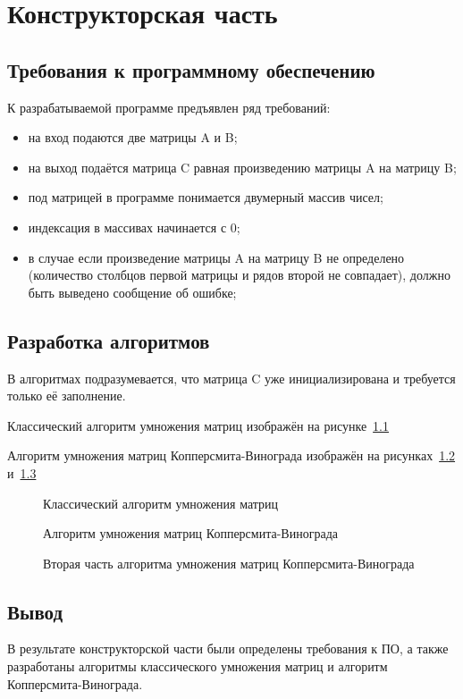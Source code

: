 \chapter{Конструкторская часть}

\section{Требования к программному обеспечению}

К разрабатываемой программе предъявлен ряд требований:

\begin{itemize}
	\item на вход подаются две матрицы A и B;
	\item на выход подаётся матрица C равная произведению матрицы A на матрицу B;
	\item под матрицей в программе понимается двумерный массив чисел;
	\item индексация в массивах начинается с 0;
	\item в случае если произведение матрицы A на матрицу B не определено (количество столбцов первой матрицы и рядов второй не совпадает), должно быть выведено сообщение об ошибке;
\end{itemize}

\section{Разработка алгоритмов}

В алгоритмах подразумевается, что матрица C уже инициализирована и требуется только её заполнение.

Классический алгоритм умножения матриц изображён на рисунке~\ref{fig:alg_classic}

Алгоритм умножения матриц Копперсмита-Винограда изображён на рисунках~\ref{fig:alg_winograd} и~\ref{fig:alg_winograd_sub}

\begin{figure}[h!]
	
	\caption{Классический алгоритм умножения матриц}
	\label{fig:alg_classic}
\end{figure}

\begin{figure}[h!]
	
	\caption{Алгоритм умножения матриц Копперсмита-Винограда}
	\label{fig:alg_winograd}
\end{figure} 

\begin{figure}[h!]
	\centering
	
	\caption{Вторая часть алгоритма умножения матриц Копперсмита-Винограда}
	\label{fig:alg_winograd_sub}
\end{figure} 

\section{Вывод}

В результате конструкторской части были определены требования к ПО, а также разработаны алгоритмы классического умножения матриц и алгоритм Копперсмита-Винограда.

\clearpage